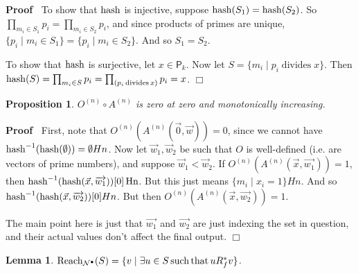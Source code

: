 \documentclass{article}
\newcommand{\tmop}[1]{\ensuremath{\operatorname{#1}}}
\newenvironment{proof}{\noindent\textbf{Proof\ }}{\hspace*{\fill}$\Box$\medskip}
\newtheorem{lemma}{Lemma}
\newtheorem{proposition}{Proposition}
\newcommand{\Net}{\ensuremath{\mathcal{N}}}
\newcommand{\Primes}{\mathsf{P}}
\newcommand{\hash}{\textsf{\tmop{hash}}}
\newcommand{\Reach}{\textsf{\tmop{Reach}}}
\begin{document}
\begin{proof}
  To show that $\hash$ is injective, suppose $\hash (S_1) = \hash (S_2)$. So
  $\prod_{m_i \in S_1} p_i = \prod_{m_i \in S_2} p_i$, and since products of
  primes are unique, $\{ p_i \mid m_i \in S_1 \} = \{ p_i \mid m_i \in S_2
  \}$. And so $S_1 = S_2$.
  
  To show that $\hash$ is surjective, let $x \in \Primes_k$. Now let $S = \{
  m_i \mid p_i \tmop{divides} x \}$. Then $\hash (S) = \prod_{m_i \in S} p_i =
  \prod_{(p_i \tmop{divides} x {\small \text{})}} p_i = x$.
\end{proof}

\begin{proposition}
  $O^{(n)} \circ A^{(n)}$ is zero at zero and monotonically increasing.
\end{proposition}

\begin{proof}
  First, note that $O^{(n)} (A^{(n)} (\vec{0}, \vec{w})) = 0$, since we cannot
  have $\hash^{- 1} (\hash (\emptyset)) = \emptyset H n$. Now let $\vec{w}_1,
  \vec{w}_2$ be such that $O$ is well-defined (i.e. are vectors of prime
  numbers), and suppose $\vec{w}_1 < \vec{w}_2$. If $O^{(n)} (A^{(n)}
  (\vec{x}, \overrightarrow{w_1})) = 1$, then $\hash^{- 1} (\hash (\vec{x},
  \overrightarrow{w_1})) [0] \tmop{Hn}$. But this just means $\{ m_i \mid x_i
  = 1 \} H n$. And so $\hash^{- 1} (\hash (\vec{x}, \overrightarrow{w_2})) [0]
  H n$. But then $O^{(n)} (A^{(n)} (\vec{x}, \overrightarrow{w_2})) = 1$.
  
  The main point here is just that $\overrightarrow{w_1}$ and
  $\overrightarrow{w_2}$ are just indexing the set in question, and their
  actual values don't affect the final output.
\end{proof}

\begin{lemma}
  \label{lemma-Reach-and-R*}$\Reach_{\Net^{\bullet}} (S) = \{ v \mid \exists u
  \in S \tmop{such} \tmop{that} u R^{\ast}_f v \}$.
\end{lemma}
\end{document}
